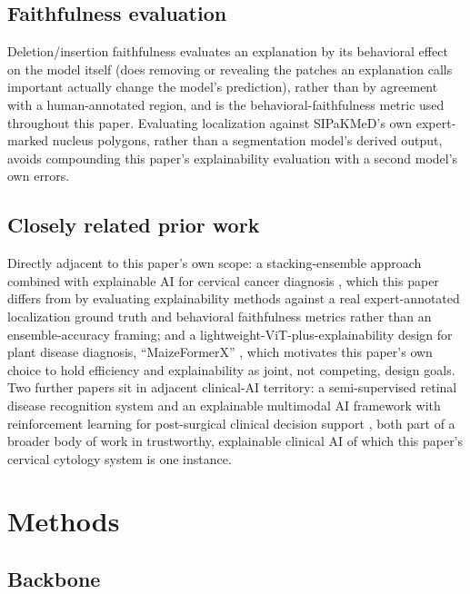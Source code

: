 \documentclass[runningheads]{llncs}
\begin{document}
\subsection{Faithfulness evaluation}

Deletion/insertion faithfulness \cite{petsiuk2018rise} evaluates an
explanation by its behavioral effect on the model itself (does removing
or revealing the patches an explanation calls important actually change
the model's prediction), rather than by agreement with a human-annotated
region, and is the behavioral-faithfulness metric used throughout this
paper. Evaluating localization against SIPaKMeD's own expert-marked
nucleus polygons, rather than a segmentation model's derived output,
avoids compounding this paper's explainability evaluation with a second
model's own errors.

\subsection{Closely related prior work}

Directly adjacent to this paper's own scope: a stacking-ensemble approach
combined with explainable AI for cervical cancer diagnosis
\cite{mohiuddin2025}, which this paper differs from by evaluating
explainability methods against a real expert-annotated localization
ground truth and behavioral faithfulness metrics rather than an
ensemble-accuracy framing; and a lightweight-ViT-plus-explainability
design for plant disease diagnosis, ``MaizeFormerX''
\cite{rahman2026maizeformerx}, which motivates this paper's own choice to
hold efficiency and explainability as joint, not competing, design goals.
Two further papers sit in adjacent clinical-AI territory: a
semi-supervised retinal disease recognition system
\cite{gony2026retinal} and an explainable multimodal AI framework with
reinforcement learning for post-surgical clinical decision support
\cite{ahmed2026postsurgical}, both part of a broader body of work in
trustworthy, explainable clinical AI of which this paper's cervical
cytology system is one instance.

\section{Methods}

\subsection{Backbone}
\end{document}

